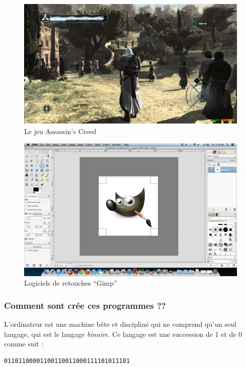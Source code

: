 \documentclass[12pt]{article}
\begin{document}
            \begin{figure}[H]
                \centering
                \includegraphics[width=\textwidth, height=2.5in]{img/3_assassins_creed.jpg}
                \caption{Le jeu Assassin's Creed}
            \end{figure}
            \begin{figure}[H]
                \centering
                \includegraphics[width=\textwidth]{img/4_gimp.png}
                \caption{Logiciels de retouches ``Gimp''}
            \end{figure}

        \subsubsection{Comment sont crée ces programmes ??}
            L'ordinateur est une machine bête et discipliné qui ne comprend qu'un seul langage, qui est le langage
            \emph{binaire}. Ce langage est une succession de 1 et de 0 comme suit : 
            \begin{lstlisting}[style=code,numbers=none]
01101100001100110011000111101011101
            \end{lstlisting}
            
\end{document}
